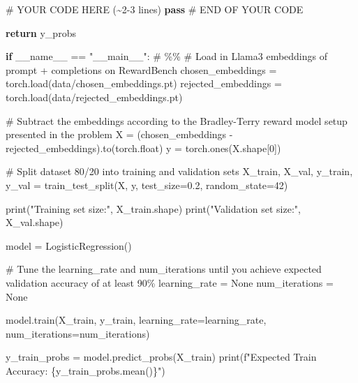 \documentclass[
  letterpaper,
  numbers=noenddot,
  DIV=11]{scrreprt}
\newenvironment{Shaded}{\begin{snugshade}}{\end{snugshade}}
\newcommand{\BuiltInTok}[1]{\textcolor[rgb]{0.00,0.23,0.31}{#1}}
\newcommand{\CommentTok}[1]{\textcolor[rgb]{0.37,0.37,0.37}{#1}}
\newcommand{\ControlFlowTok}[1]{\textcolor[rgb]{0.00,0.23,0.31}{\textbf{#1}}}
\newcommand{\DecValTok}[1]{\textcolor[rgb]{0.68,0.00,0.00}{#1}}
\newcommand{\FloatTok}[1]{\textcolor[rgb]{0.68,0.00,0.00}{#1}}
\newcommand{\NormalTok}[1]{\textcolor[rgb]{0.00,0.23,0.31}{#1}}
\newcommand{\OperatorTok}[1]{\textcolor[rgb]{0.37,0.37,0.37}{#1}}
\newcommand{\RegionMarkerTok}[1]{\textcolor[rgb]{0.00,0.23,0.31}{#1}}
\newcommand{\SpecialCharTok}[1]{\textcolor[rgb]{0.37,0.37,0.37}{#1}}
\newcommand{\SpecialStringTok}[1]{\textcolor[rgb]{0.13,0.47,0.30}{#1}}
\newcommand{\StringTok}[1]{\textcolor[rgb]{0.13,0.47,0.30}{#1}}
\newcommand{\VariableTok}[1]{\textcolor[rgb]{0.07,0.07,0.07}{#1}}
\theoremstyle{definition}
\theoremstyle{plain}
\theoremstyle{plain}
\theoremstyle{remark}
\begin{document}
\begin{tcolorbox}[colframe=.grey, title=\faCode \enspace Code]
\begin{Shaded}
\begin{Highlighting}[numbers=left,,]
        \CommentTok{\# YOUR CODE HERE (\textasciitilde{}2{-}3 lines)}
        \ControlFlowTok{pass}
        \CommentTok{\# }\RegionMarkerTok{END}\CommentTok{ OF YOUR CODE}

        \ControlFlowTok{return}\NormalTok{ y\_probs}


\ControlFlowTok{if} \VariableTok{\_\_name\_\_} \OperatorTok{==} \StringTok{"\_\_main\_\_"}\NormalTok{:}
    \CommentTok{\# \%\%}
    \CommentTok{\# Load in Llama3 embeddings of prompt + completions on RewardBench}
\NormalTok{    chosen\_embeddings }\OperatorTok{=}\NormalTok{ torch.load(}\StringTok{\textquotesingle{}data/chosen\_embeddings.pt\textquotesingle{}}\NormalTok{)}
\NormalTok{    rejected\_embeddings }\OperatorTok{=}\NormalTok{ torch.load(}\StringTok{\textquotesingle{}data/rejected\_embeddings.pt\textquotesingle{}}\NormalTok{)}

    \CommentTok{\# Subtract the embeddings according to the Bradley{-}Terry reward model setup presented in the problem }
\NormalTok{    X }\OperatorTok{=}\NormalTok{ (chosen\_embeddings }\OperatorTok{{-}}\NormalTok{ rejected\_embeddings).to(torch.}\BuiltInTok{float}\NormalTok{)}
\NormalTok{    y }\OperatorTok{=}\NormalTok{ torch.ones(X.shape[}\DecValTok{0}\NormalTok{])}

    \CommentTok{\# Split dataset 80/20 into training and validation sets}
\NormalTok{    X\_train, X\_val, y\_train, y\_val }\OperatorTok{=}\NormalTok{ train\_test\_split(X, y, test\_size}\OperatorTok{=}\FloatTok{0.2}\NormalTok{, random\_state}\OperatorTok{=}\DecValTok{42}\NormalTok{)  }

    \BuiltInTok{print}\NormalTok{(}\StringTok{"Training set size:"}\NormalTok{, X\_train.shape)}
    \BuiltInTok{print}\NormalTok{(}\StringTok{"Validation set size:"}\NormalTok{, X\_val.shape)}

\NormalTok{    model }\OperatorTok{=}\NormalTok{ LogisticRegression()}

    \CommentTok{\# Tune the learning\_rate and num\_iterations until you achieve expected validation accuracy of at least 90\%}
\NormalTok{    learning\_rate }\OperatorTok{=} \VariableTok{None}
\NormalTok{    num\_iterations }\OperatorTok{=} \VariableTok{None}

\NormalTok{    model.train(X\_train, y\_train, learning\_rate}\OperatorTok{=}\NormalTok{learning\_rate, num\_iterations}\OperatorTok{=}\NormalTok{num\_iterations)}

\NormalTok{    y\_train\_probs }\OperatorTok{=}\NormalTok{ model.predict\_probs(X\_train)}
    \BuiltInTok{print}\NormalTok{(}\SpecialStringTok{f"Expected Train Accuracy: }\SpecialCharTok{\{}\NormalTok{y\_train\_probs}\SpecialCharTok{.}\NormalTok{mean()}\SpecialCharTok{\}}\SpecialStringTok{"}\NormalTok{)}


\end{Highlighting}
\end{Shaded}
\end{tcolorbox}
\end{document}
